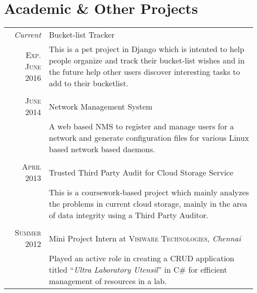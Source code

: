 \documentclass[a4paper,10pt]{article}
\begin{document}
\section{Academic \& Other Projects}
\begin{tabular}{r|p{11cm}}
 
  \emph{Current} & Bucket-list Tracker \\
  \textsc{Exp. June 2016} & \footnotesize{This is a pet project in Django which is intented to help people organize and track their bucket-list wishes and in the future help other users discover interesting tasks to add to their bucketlist. }\\\multicolumn{2}{c}{} \\
 
 \textsc{June 2014} & Network Management System \\&\footnotesize{A web based NMS to register and manage users for a network and generate configuration files for various Linux based network based daemons.}\\\multicolumn{2}{c}{} \\
  
 \textsc{April 2013} & Trusted Third Party Audit for Cloud Storage Service \\&\footnotesize{This is a coursework-based project which mainly analyzes the problems in current cloud storage, mainly in the area of data integrity using a Third Party Auditor. }\\\multicolumn{2}{c}{} \\
 
\textsc{Summer 2012} & Mini Project Intern at \textsc{Visiware Technologies}, \emph{Chennai}\\&\footnotesize{Played an active role in creating a CRUD application titled ``\emph{Ultra Laboratory Utensil}'' in C\# for efficient management of resources in a lab.}
\end{tabular}

\end{document}
